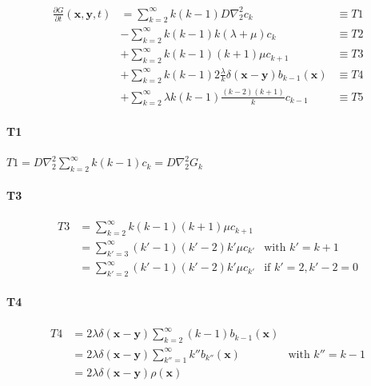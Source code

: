 \begin{subequations} 
\begin{align}
\frac{\partial G}{\partial t}(\boldsymbol{x},\boldsymbol{y},t) & =\sum_{k=2}^{\infty}k(k-1)D\nabla_{2}^{2}c_{k} & \equiv T1\label{nk_diffusion}\\
 & -\sum_{k=2}^{\infty}k(k-1)k(\lambda+\mu)c_{k} & \equiv T2\label{nk_same_state}\\
 & +\sum_{k=2}^{\infty}k(k-1)(k+1)\mu c_{k+1} & \equiv T3\label{nk_death}\\
 & +\sum_{k=2}^{\infty}k(k-1)2\frac{\lambda}{k}\delta(\boldsymbol{x}-\boldsymbol{y})b_{k-1}(\boldsymbol{x}) & \equiv T4\label{nk_birth}\\
 & +\sum_{k=2}^{\infty}\lambda k(k-1)\frac{(k-2)(k+1)}{k}c_{k-1} & \equiv T5\label{eq:nk_birth2}
\end{align}
\end{subequations}

\paragraph*{T1}

$T1=D\nabla^2_2\sum_{k=2}^\infty k(k-1)c_k=D\nabla_{2}^{2}G_{k}$

\paragraph*{T3}

\begin{subequations}
\begin{align}
T3 & =\sum_{k=2}^{\infty}k(k-1)(k+1)\mu c_{k+1}\label{la}\\
 & =\sum_{k'=3}^{\infty}(k'-1)(k'-2)k'\mu c_{k'} & \text{with }k'=k+1\\
 & =\sum_{k'=2}^{\infty}(k'-1)(k'-2)k'\mu c_{k'} & \text{if }k'=2,k'-2=0
\end{align}

\end{subequations}

\paragraph*{T4}

\begin{subequations}

\begin{align}
T4 & =2\lambda\delta(\boldsymbol{x}-\boldsymbol{y})\sum_{k=2}^{\infty}(k-1)b_{k-1}(\boldsymbol{x})\label{la-2}\\
 & =2\lambda\delta(\boldsymbol{x}-\boldsymbol{y})\sum_{k''=1}^{\infty}k''b_{k''}(\boldsymbol{x}) &\text{with }k''=k-1\\
 & =2\lambda\delta(\boldsymbol{x}-\boldsymbol{y})\rho(\boldsymbol{x}) &
\end{align}

\end{subequations}

